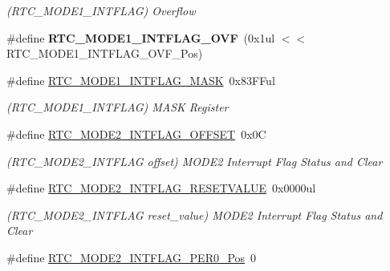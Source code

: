 \begin{DoxyCompactItemize}
\begin{DoxyCompactList}\small\item\em (R\+T\+C\+\_\+\+M\+O\+D\+E1\+\_\+\+I\+N\+T\+F\+L\+A\+G) Overflow \end{DoxyCompactList}\item 
\hypertarget{group___s_a_m_l21___r_t_c_ga0ffb588b3f716a71e5759d0401964df3}{}\#define {\bfseries R\+T\+C\+\_\+\+M\+O\+D\+E1\+\_\+\+I\+N\+T\+F\+L\+A\+G\+\_\+\+O\+V\+F}~(0x1ul $<$$<$ R\+T\+C\+\_\+\+M\+O\+D\+E1\+\_\+\+I\+N\+T\+F\+L\+A\+G\+\_\+\+O\+V\+F\+\_\+\+Pos)\label{group___s_a_m_l21___r_t_c_ga0ffb588b3f716a71e5759d0401964df3}

\item 
\hypertarget{group___s_a_m_l21___r_t_c_ga2c1c81902821896ffb3cd940796fb0cd}{}\#define \hyperlink{group___s_a_m_l21___r_t_c_ga2c1c81902821896ffb3cd940796fb0cd}{R\+T\+C\+\_\+\+M\+O\+D\+E1\+\_\+\+I\+N\+T\+F\+L\+A\+G\+\_\+\+M\+A\+S\+K}~0x83\+F\+Ful\label{group___s_a_m_l21___r_t_c_ga2c1c81902821896ffb3cd940796fb0cd}

\begin{DoxyCompactList}\small\item\em (R\+T\+C\+\_\+\+M\+O\+D\+E1\+\_\+\+I\+N\+T\+F\+L\+A\+G) M\+A\+S\+K Register \end{DoxyCompactList}\item 
\hypertarget{group___s_a_m_l21___r_t_c_ga8d97d4b882aeeaee57893f5e04247e73}{}\#define \hyperlink{group___s_a_m_l21___r_t_c_ga8d97d4b882aeeaee57893f5e04247e73}{R\+T\+C\+\_\+\+M\+O\+D\+E2\+\_\+\+I\+N\+T\+F\+L\+A\+G\+\_\+\+O\+F\+F\+S\+E\+T}~0x0\+C\label{group___s_a_m_l21___r_t_c_ga8d97d4b882aeeaee57893f5e04247e73}

\begin{DoxyCompactList}\small\item\em (R\+T\+C\+\_\+\+M\+O\+D\+E2\+\_\+\+I\+N\+T\+F\+L\+A\+G offset) M\+O\+D\+E2 Interrupt Flag Status and Clear \end{DoxyCompactList}\item 
\hypertarget{group___s_a_m_l21___r_t_c_gafe38a73ac226319f86927d8ee8a796fe}{}\#define \hyperlink{group___s_a_m_l21___r_t_c_gafe38a73ac226319f86927d8ee8a796fe}{R\+T\+C\+\_\+\+M\+O\+D\+E2\+\_\+\+I\+N\+T\+F\+L\+A\+G\+\_\+\+R\+E\+S\+E\+T\+V\+A\+L\+U\+E}~0x0000ul\label{group___s_a_m_l21___r_t_c_gafe38a73ac226319f86927d8ee8a796fe}

\begin{DoxyCompactList}\small\item\em (R\+T\+C\+\_\+\+M\+O\+D\+E2\+\_\+\+I\+N\+T\+F\+L\+A\+G reset\+\_\+value) M\+O\+D\+E2 Interrupt Flag Status and Clear \end{DoxyCompactList}\item 
\hypertarget{group___s_a_m_l21___r_t_c_ga8c40fbd124282bd46b68cb8bacd4f266}{}\#define \hyperlink{group___s_a_m_l21___r_t_c_ga8c40fbd124282bd46b68cb8bacd4f266}{R\+T\+C\+\_\+\+M\+O\+D\+E2\+\_\+\+I\+N\+T\+F\+L\+A\+G\+\_\+\+P\+E\+R0\+\_\+\+Pos}~0\label{group___s_a_m_l21___r_t_c_ga8c40fbd124282bd46b68cb8bacd4f266}


\end{DoxyCompactItemize}
